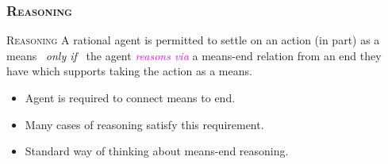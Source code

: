 \documentclass[noamssymb,
graphics,
]{beamer} %
\newcommand{\schemaName}[1]{\textsc{#1}}
\begin{document}
\begin{frame}
  \frametitle{\schemaName{Reasoning}}

  \begin{block}{\schemaName{Reasoning}}
    A rational agent is permitted to settle on an action (in part) as a means
    \newline
    \mbox{ }\hfill\emph{only if}\hfill\mbox{ }
    \newline
    the agent \textcolor{fuchsia}{\emph{reasons via}} a means-end relation from an end they have which supports taking the action as a means.
  \end{block}

  \begin{itemize}
  \item Agent is required to connect means to end.
  \item Many cases of reasoning satisfy this requirement.
  \item Standard way of thinking about means-end reasoning.
  \end{itemize}
\end{frame}
\end{document}
